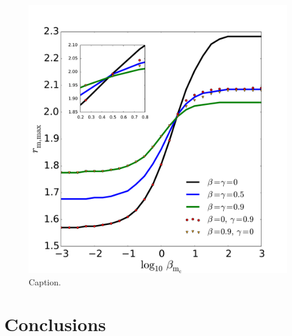 \documentclass{aa}
\begin{document}
\begin{figure}
\hspace{-0.2cm}
\includegraphics[scale=0.16]{figures/fig6c.pdf}
\caption{Caption.}
           \label{max-vs-magnetization}%
 \end{figure}

\section{Conclusions}

%
\end{document}

